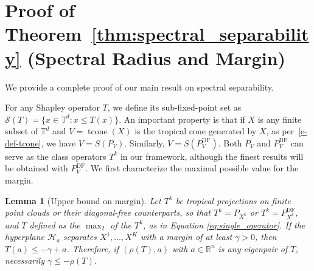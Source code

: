 \documentclass{article}
\newtheorem{lemma}[theorem]{Lemma}
\newcommand{\tcone}{\operatorname{tcone}}
\newcommand{\Pdiagfree}{P^{\text{DF}}}
\renewcommand{\leq}{\leqslant}
\newcommand{\R}{\mathbb{R}}
\newcommand{\trop}{\mathbb{T}}
\begin{document}




\newpage
\appendix
\section{Proof of Theorem~\ref{thm:spectral_separability} (Spectral Radius and Margin)}\label{appendix:proofs}
We provide a complete proof of our main result on spectral separability.

For any Shapley operator $T$, we define its sub-fixed-point
set as $\mathcal{S}(T) = \{x \in \trop^d : x \leq T(x)\}$.
An important property is that if $X$ is any finite subset of $\trop^d$
and $V=\tcone(X)$ is the tropical cone generated by $X$, as per~\eqref{e-def-tcone},
we have $V = S(P_V)$. Similarly, $V = S(P^{\text{DF}}_V)$.
Both $P_V$ and $\Pdiagfree_V$ 
can serve as the class operators $T^k$ in our framework,
although the finest results will be obtained with $\Pdiagfree_V$. 
We first characterize the maximal possible value for the margin.

\begin{lemma}[Upper bound on margin]\label{lemma:hyperplane_to_operator}
Let $T^k$ be tropical projections on finite point clouds or their diagonal-free counterparts, so that $T^k = P_{X^k}$ or $T^k=\Pdiagfree_{X^k}$, and $T$ defined as the $\operatorname{\max}_2$ of the $T^k$, as in Equation \ref{eq:single_operator}.
If the hyperplane $\mathcal{H}_a$ separates $X^1,\ldots,X^K$ with a margin of at least $\gamma > 0$, then $T(a) \leq -\gamma + a$.
Therefore, if $(\rho(T),a)$ with $a\in\R^n$ is any eigenpair of $T$, necessarily $\gamma \le -\rho(T)$.
\end{lemma}
\end{document}
